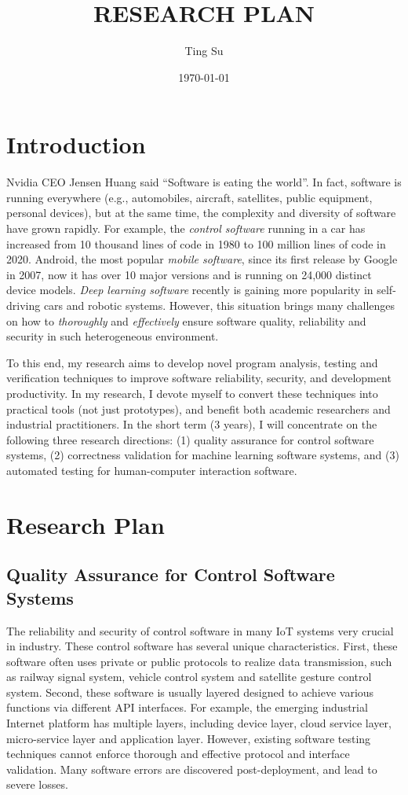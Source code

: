 \documentclass[a4paper]{article}
\title{RESEARCH PLAN}
\author{Ting Su}
\date{\today}
\begin{document}
\fontsize{12}{15}
\selectfont
\maketitle

\section{Introduction}

Nvidia CEO Jensen Huang said ``Software is eating the world''. In fact, software is running everywhere (e.g., automobiles, aircraft, satellites, public equipment, personal devices), but at the same time,
the complexity and diversity of software have grown rapidly.
For example, the \emph{control software} running in a car has increased from 10 thousand lines of code in 1980 to 100 million lines of code in 2020.
Android, the most popular \emph{mobile software}, since its first release by Google in 2007, now it has over 10 major versions and is running on 24,000 distinct  device models. 
\emph{Deep learning software} recently is gaining more popularity in self-driving cars and robotic systems.
However, this situation brings many challenges on how to \emph{thoroughly} and \emph{effectively} ensure software quality, reliability and security in such heterogeneous environment.

To this end, my research aims to develop novel program analysis, testing and verification techniques to improve software reliability, security, and development productivity. In my research, I devote myself to convert these techniques into practical tools (not just prototypes), and benefit both academic researchers and industrial practitioners. 
In the short term (3 years), I will concentrate on the following three research directions: 
(1) quality assurance for control software systems, (2) correctness validation for machine learning software systems, and (3) automated testing for human-computer interaction software.

\section{Research Plan}

\subsection{Quality Assurance for Control Software Systems}

The reliability and security of control software in many IoT systems very crucial in industry.
These control software has several unique characteristics. 
First, these software often uses private or public protocols to realize data transmission, such as railway signal system, vehicle control system and satellite gesture control system. 
Second, these software is usually layered designed to achieve various functions via different API interfaces.
For example, the emerging industrial Internet platform has multiple layers, including device layer, cloud service layer, micro-service layer and application layer. 
However, existing software testing techniques cannot enforce thorough and effective protocol and interface validation. Many software errors are discovered post-deployment, and lead to severe losses. 
\end{document}
